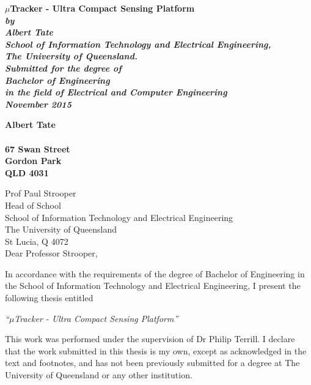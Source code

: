 \documentclass[12pt,openany,a4paper]{book}
\renewcommand{\baselinestretch}{1.2}	%
\begin{document}
\frontmatter

\begin{titlepage}
\renewcommand{\baselinestretch}{1.0}
\begin{center}
\vspace*{35mm}
\Huge\bf
	$\mu$Tracker - Ultra Compact Sensing Platform \\
\vspace{20mm}
\large\sl
		by\\
		Albert Tate
		\medskip\\
\rm
		School of Information Technology and Electrical Engineering,\\
		The University of Queensland.\\
\vspace{30mm}
		Submitted for the degree of\\
		Bachelor of Engineering
		\smallskip\\
\normalsize
		in the field of Electrical and Computer Engineering
		\medskip\\
\large
		November 2015		
\end{center}
\end{titlepage}

\cleardoublepage

\begin{flushright}
	\bf Albert Tate\\ \\
	67 Swan Street\\
	Gordon Park\\
	QLD 4031\\
	\medskip
\end{flushright}
\begin{flushleft}
  Prof Paul Strooper\\
  Head of School\\
  School of Information Technology and Electrical Engineering\\
  The University of Queensland\\
  St Lucia, Q 4072\\
  \bigskip\bigskip
  Dear Professor Strooper,
\end{flushleft}

In accordance with the requirements of the degree of Bachelor of
Engineering in the School of Information Technology and Electrical Engineering,
I present the following thesis entitled 
\begin{center}
	\emph{``$\mu$Tracker - Ultra Compact Sensing Platform''}
\end{center}  This work was performed under the supervision of Dr Philip Terrill.
I declare that the work submitted in this thesis is my own, except as
acknowledged in the text and footnotes, and has not been previously
submitted for a degree at The University of Queensland or any other
institution.
\end{document}
